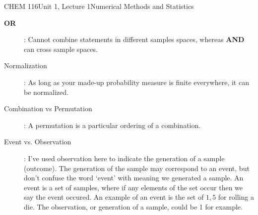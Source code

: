 \documentclass{article}
\begin{document}
\begin{tdoc}{CHEM 116}{Unit 1, Lecture 1}{Numerical Methods and Statistics}
\begin{description}
\item[{\bf OR}]: Cannot combine statements in different samples spaces, whereas {\bf AND} can cross sample spaces.\vspace{0.2cm}\\

\item[Normalization]: As long as your made-up probability measure is
finite everywhere, it can be normalized.

\item[Combination vs Permutation]: A permutation is a particular
  ordering of a combination.

\item[Event vs. Observation]: I've used observation here to indicate
  the generation of a sample (outcome). The generation of the sample
  may correspond to an event, but don't confuse the word `event' with
  meaning we generated a sample. An event is a set of samples, where
  if any elements of the set occur then we say the event occured. An
  example of an event is the set of ${1,5}$ for rolling a die. The
  observation, or generation of a sample, could be 1 for example.

\end{description}

\end{tdoc}
\end{document}
